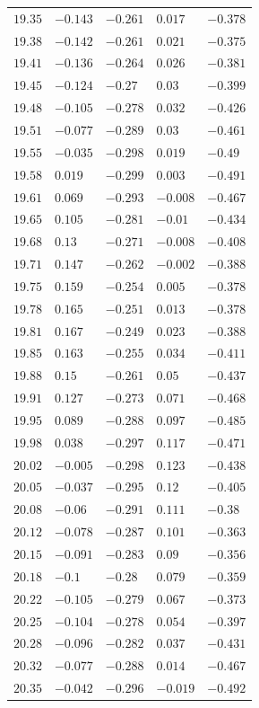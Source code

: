\begin{center}
\begin{longtable}{lllll}
$19.35$&$-0.143$&$-0.261$&$0.017$&$-0.378$\\
$19.38$&$-0.142$&$-0.261$&$0.021$&$-0.375$\\
$19.41$&$-0.136$&$-0.264$&$0.026$&$-0.381$\\
$19.45$&$-0.124$&$-0.27$&$0.03$&$-0.399$\\
$19.48$&$-0.105$&$-0.278$&$0.032$&$-0.426$\\
$19.51$&$-0.077$&$-0.289$&$0.03$&$-0.461$\\
$19.55$&$-0.035$&$-0.298$&$0.019$&$-0.49$\\
$19.58$&$0.019$&$-0.299$&$0.003$&$-0.491$\\
$19.61$&$0.069$&$-0.293$&$-0.008$&$-0.467$\\
$19.65$&$0.105$&$-0.281$&$-0.01$&$-0.434$\\
$19.68$&$0.13$&$-0.271$&$-0.008$&$-0.408$\\
$19.71$&$0.147$&$-0.262$&$-0.002$&$-0.388$\\
$19.75$&$0.159$&$-0.254$&$0.005$&$-0.378$\\
$19.78$&$0.165$&$-0.251$&$0.013$&$-0.378$\\
$19.81$&$0.167$&$-0.249$&$0.023$&$-0.388$\\
$19.85$&$0.163$&$-0.255$&$0.034$&$-0.411$\\
$19.88$&$0.15$&$-0.261$&$0.05$&$-0.437$\\
$19.91$&$0.127$&$-0.273$&$0.071$&$-0.468$\\
$19.95$&$0.089$&$-0.288$&$0.097$&$-0.485$\\
$19.98$&$0.038$&$-0.297$&$0.117$&$-0.471$\\
$20.02$&$-0.005$&$-0.298$&$0.123$&$-0.438$\\
$20.05$&$-0.037$&$-0.295$&$0.12$&$-0.405$\\
$20.08$&$-0.06$&$-0.291$&$0.111$&$-0.38$\\
$20.12$&$-0.078$&$-0.287$&$0.101$&$-0.363$\\
$20.15$&$-0.091$&$-0.283$&$0.09$&$-0.356$\\
$20.18$&$-0.1$&$-0.28$&$0.079$&$-0.359$\\
$20.22$&$-0.105$&$-0.279$&$0.067$&$-0.373$\\
$20.25$&$-0.104$&$-0.278$&$0.054$&$-0.397$\\
$20.28$&$-0.096$&$-0.282$&$0.037$&$-0.431$\\
$20.32$&$-0.077$&$-0.288$&$0.014$&$-0.467$\\
$20.35$&$-0.042$&$-0.296$&$-0.019$&$-0.492$\\

\end{longtable}
\end{center}
